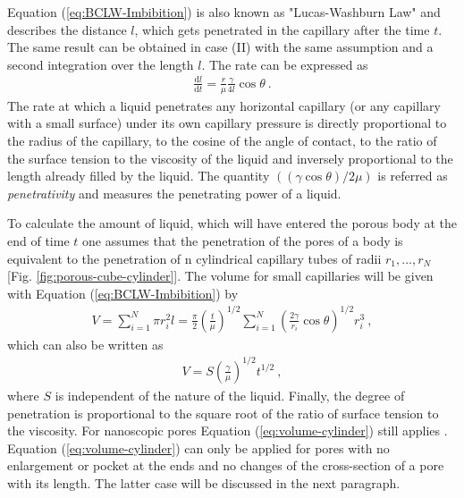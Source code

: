 \documentclass[aip, amsmath, amssymb, reprint, twocolumn, floatfix]{revtex4-1}
\newcommand{\dldt}{\frac{\mathrm{d}l}{\mathrm{d}t}}
\begin{document}
Equation (\ref{eq:BCLW-Imbibition}) is also known as "Lucas-Washburn Law" and describes the distance $l$, which gets penetrated in the capillary after the time $t$. The same result can be obtained in case (II) with the same assumption and a second integration over the length $l$. The rate can be expressed as
\begin{gather}
	\boxed{\dldt = \frac{r}{\mu} \frac{\gamma}{4l} \cos \theta}~.
	\label{eq:rate}
\end{gather}
The rate at which a liquid penetrates any horizontal capillary (or any capillary with a small surface) under its own capillary pressure is directly proportional to the radius of the capillary, to the cosine of the angle of contact, to the ratio of the surface tension to the viscosity of the liquid and inversely proportional to the length already filled by the liquid. The quantity $((\gamma \cos \theta)/2 \mu)$ is referred as \textit{penetrativity} and measures the penetrating power of a liquid. 
\bigskip

\begin{center}
	\captionsetup{type=figure}
	
	\label{fig:porous-cube-cylinder}
\end{center}

To calculate the amount of liquid, which will have entered the porous body at the end of time $t$ one assumes that the penetration of the pores of a body is equivalent to the penetration of n cylindrical capillary tubes of radii ${r_1,...,r_N}$ [Fig. \ref{fig:porous-cube-cylinder}]. The volume for small capillaries will be given with Equation (\ref{eq:BCLW-Imbibition}) by
\begin{gather}
	V = \sum_{i=1}^N \pi r_i^2 l = \frac{\pi}{2} \left(\frac{t}{\mu}\right)^{1/2} \sum_{i=1}^N \left(\frac{2 \gamma}{r_i}\cos\theta \right)^{1/2} r_i^3~,
\end{gather}
which can also be written as
\begin{gather}
	\boxed{V = S \left(\frac{\gamma}{\mu}\right)^{1/2} t^{1/2}}~, 
	\label{eq:volume-cylinder}
\end{gather}
where $S$ is independent of the nature of the liquid. Finally, the degree of penetration is proportional to the square root of the ratio of surface tension to the viscosity. For nanoscopic pores Equation (\ref{eq:volume-cylinder}) still applies \cite{Dimitrov2007,Gruener2009a,Gruener2009b}. Equation (\ref{eq:volume-cylinder}) can only be applied for pores with no enlargement or pocket at the ends and no changes of the cross-section of a pore with its length. The latter case will be discussed in the next paragraph.
\end{document}

